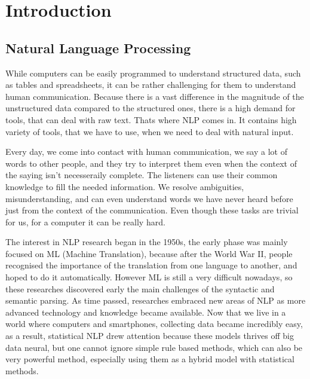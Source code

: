 \chapter*{Introduction}
\section{Natural Language Processing}
While computers can be easily programmed to understand structured data, such as tables and spreadsheets, it can be rather challenging for them
to understand human communication. Because there is a vast difference in the magnitude of the unstructured data compared to the structured ones, there is a high demand
for tools, that can deal with raw text. Thats where NLP comes in. It contains high variety of tools, that we have to use, when we need to deal with natural input.

Every day, we come into contact with human communication, we say a lot of words to other people, and they try to interpret them even when the context of the saying 
isn't necesseraily complete. The listeners can use their common knowledge to fill the needed information. We resolve ambiguities, misunderstanding, and can even understand words 
we have never heard before just from the context of the communication.
Even though these tasks are trivial for us, for a computer it can be really hard.

The interest in NLP research began in the 1950s, the early phase was mainly focused on ML (Machine Translation), because after the World War II, people
recognised the importance of the translation from one language to another, and hoped to do it automatically.
However ML is still a very difficult nowadays, so these researches discovered early the main challenges of the syntactic and semantic parsing.
As time passed, researches embraced new areas of NLP as more advanced technology and knowledge became available. Now that we live in a world where
computers and smartphones, collecting data became incredibly easy, as a result, statistical NLP drew attention because these models thrives off big data neural, but one cannot ignore 
simple rule based methods, which can also be very powerful method, especially using them as a hybrid model with statistical methods.

